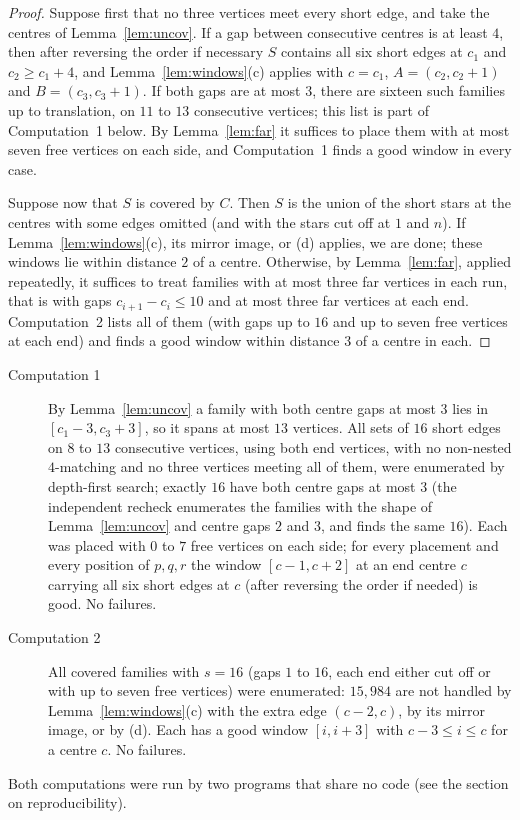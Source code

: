 \documentclass[11pt]{amsart}
\theoremstyle{definition}\newtheorem{problem}{Problem}
\theoremstyle{remark}\newtheorem*{remark}{Remark}
\begin{document}
\begin{proof}
Suppose first that no three vertices meet every short edge, and take the centres of Lemma~\ref{lem:uncov}. If a gap
between consecutive centres is at least $4$, then after reversing the order if necessary $S$ contains all six short
edges at $c_1$ and $c_2\ge c_1+4$, and Lemma~\ref{lem:windows}(c) applies with $c=c_1$, $A=(c_2,c_2+1)$ and
$B=(c_3,c_3+1)$. If both gaps are at most $3$, there are sixteen such families up to translation, on $11$ to $13$
consecutive vertices; this list is part of Computation~1 below. By Lemma~\ref{lem:far} it suffices to place them with
at most seven free vertices on each side, and Computation~1 finds a good window in every case.

Suppose now that $S$ is covered by $C$. Then $S$ is the union of the short stars at the centres with some edges omitted
(and with the stars cut off at $1$ and $n$). If Lemma~\ref{lem:windows}(c), its mirror image, or (d) applies, we are
done; these windows lie within distance $2$ of a centre. Otherwise, by Lemma~\ref{lem:far}, applied repeatedly, it
suffices to treat families with at most three far vertices in each run, that is with gaps $c_{i+1}-c_i\le10$ and at
most three far vertices at each end. Computation~2 lists all of them (with gaps up to $16$ and up to seven free vertices
at each end) and finds a good window within distance $3$ of a centre in each.
\end{proof}

\begin{description}
\item[Computation 1] By Lemma~\ref{lem:uncov} a family with both centre gaps at most $3$ lies in $[c_1-3,c_3+3]$,
so it spans at most $13$ vertices. All sets of $16$ short edges on $8$ to $13$ consecutive vertices, using both end
vertices, with no non-nested $4$-matching and no three vertices meeting all of them, were enumerated by depth-first
search; exactly $16$ have both centre gaps at most $3$ (the independent recheck enumerates the families with the
shape of Lemma~\ref{lem:uncov} and centre gaps $2$ and $3$, and finds the same $16$).
Each was placed with $0$ to $7$ free vertices on each side; for every placement and every position of $p,q,r$ the
window $[c-1,c+2]$ at an end centre $c$ carrying all six short edges at $c$ (after reversing the order if needed) is
good. No failures.
\item[Computation 2] All covered families with $s=16$ (gaps $1$ to $16$, each end either cut off or with up to seven
free vertices) were enumerated: $15{,}984$ are not handled by Lemma~\ref{lem:windows}(c) with the extra edge $(c-2,c)$,
by its mirror image, or by (d). Each has a good window $[i,i+3]$ with $c-3\le i\le c$ for a centre $c$. No failures.
\end{description}
Both computations were run by two programs that share no code (see the section on reproducibility).
\end{document}

